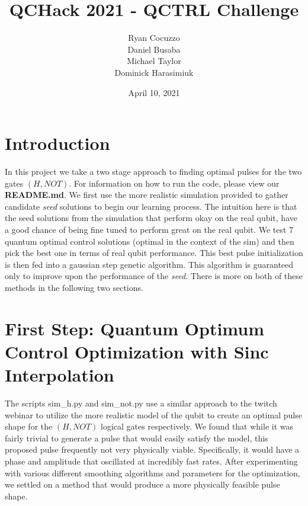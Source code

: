 \documentclass{article}
\title{QCHack 2021 - QCTRL Challenge}
\author{Ryan Cocuzzo \\ Daniel Busaba \\ Michael Taylor \\ Dominick Harasimiuk}
\date{April 10, 2021}
\begin{document}
\maketitle

\section{Introduction}
In this project we take a two stage approach to finding optimal pulses for the two gates $(H, NOT)$.
For information on how to run the code, please view our \textbf{README.md}. We first use the more realistic
simulation provided to gather candidate \textit{seed} solutions to begin our learning process. The intuition
here is that the seed solutions from the simulation that perform okay on the real qubit, have a good 
chance of being fine tuned to perform great on the real qubit. We test 7 quantum optimal control solutions 
(optimal in the context of the sim) and then pick the best one in terms of real qubit performance. 
This best pulse initialization is then fed into
a gaussian step genetic algorithm. This algorithm is guaranteed only to improve upon the performance
of the \textit{seed}. There is more on both of these methods in the following two sections.


\section{First Step: Quantum Optimum Control Optimization with Sinc Interpolation}
The scripts sim\_h.py and sim\_not.py use a similar approach to the twitch webinar to utilize the more 
realistic model of the qubit to create an optimal pulse shape for the $(H, NOT)$ logical gates 
respectively. We found that while it was fairly trivial to generate a pulse that would easily satisfy 
the model, this proposed pulse frequently not very physically viable. Specifically, it would have a phase 
and amplitude that oscillated at incredibly fast rates. After experimenting with various different smoothing 
algorithms and parameters for the optimization, we settled on a method that would produce a more physically 
feasible pulse shape. 
\end{document}
